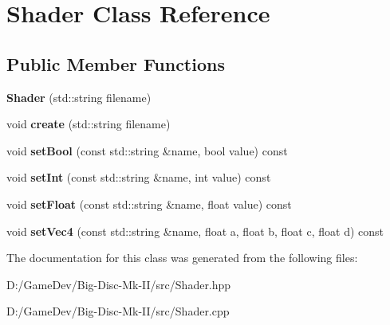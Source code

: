 \hypertarget{class_shader}{}\section{Shader Class Reference}
\label{class_shader}
\subsection*{Public Member Functions}
\begin{DoxyCompactItemize}
\item 
\mbox{\label{class_shader_a0436a2c70cb462cf8de6921d93b082ae}} 
{\bfseries Shader} (std\+::string filename)
\item 
\mbox{\label{class_shader_afd52164de2f690a3780a6705e8badcff}} 
void {\bfseries create} (std\+::string filename)
\item 
\mbox{\label{class_shader_ab1a56d6c299bd7eaa18c2e142ef7bd9f}} 
void {\bfseries set\+Bool} (const std\+::string \&name, bool value) const
\item 
\mbox{\label{class_shader_ad362e2b654cd95a3574cd505411e41fd}} 
void {\bfseries set\+Int} (const std\+::string \&name, int value) const
\item 
\mbox{\label{class_shader_afe7367621f74c2d26431d8ac15252bf3}} 
void {\bfseries set\+Float} (const std\+::string \&name, float value) const
\item 
\mbox{\label{class_shader_a3221c1f466eb7bbdcc7e78efd6434ade}} 
void {\bfseries set\+Vec4} (const std\+::string \&name, float a, float b, float c, float d) const
\end{DoxyCompactItemize}


The documentation for this class was generated from the following files\+:\begin{DoxyCompactItemize}
\item 
D\+:/\+Game\+Dev/\+Big-\/\+Disc-\/\+Mk-\/\+I\+I/src/Shader.\+hpp\item 
D\+:/\+Game\+Dev/\+Big-\/\+Disc-\/\+Mk-\/\+I\+I/src/Shader.\+cpp\end{DoxyCompactItemize}
